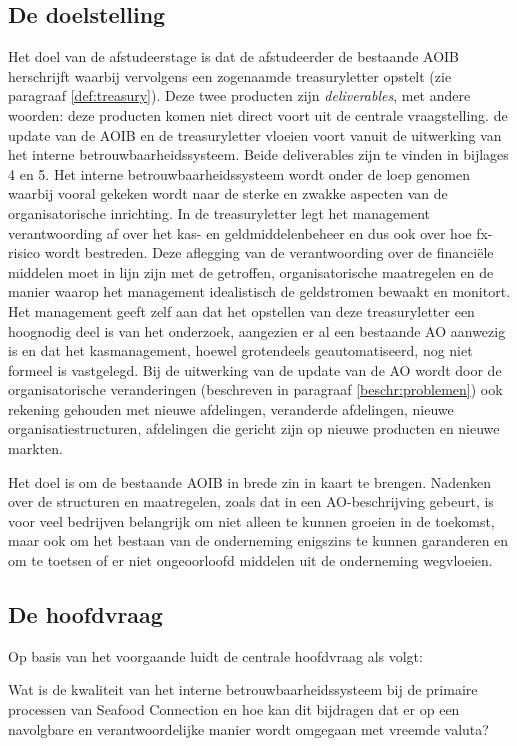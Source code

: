 \subsection{De doelstelling}
Het doel van de afstudeerstage is dat de afstudeerder de bestaande AOIB herschrijft waarbij vervolgens een zogenaamde \gls{treasuryletter} opstelt (zie paragraaf \ref{def:treasury}). Deze twee producten zijn \textit{deliverables}, met andere woorden: deze producten komen niet direct voort uit de centrale vraagstelling. de update van de AOIB en de  \gls{treasuryletter} vloeien voort vanuit de uitwerking van het interne betrouwbaarheidssysteem. Beide deliverables zijn te vinden in bijlages 4 en 5. 
Het interne betrouwbaarheidssysteem wordt onder de loep genomen waarbij vooral gekeken wordt naar de sterke en zwakke aspecten van de organisatorische inrichting. In de \gls{treasuryletter} legt het management verantwoording af over het kas- en geldmiddelenbeheer en dus ook over hoe \gls{fx}-risico wordt bestreden. Deze aflegging van de verantwoording over de financiële middelen moet in lijn zijn met de getroffen, organisatorische maatregelen en de manier waarop het management idealistisch de geldstromen bewaakt en monitort. Het management geeft zelf aan dat het opstellen van deze \gls{treasuryletter} een hoognodig deel is van het onderzoek, aangezien er al een bestaande AO aanwezig is en dat het kasmanagement, hoewel grotendeels geautomatiseerd, nog niet formeel is vastgelegd. Bij de uitwerking van de update van de AO wordt door de organisatorische veranderingen (beschreven in paragraaf \ref{beschr:problemen}) ook rekening gehouden met nieuwe afdelingen, veranderde afdelingen, nieuwe organisatiestructuren, afdelingen die gericht zijn op nieuwe producten en nieuwe markten.

Het doel is om de bestaande AOIB in brede zin in kaart te brengen. Nadenken over de structuren en maatregelen, zoals dat in een AO-beschrijving gebeurt, is voor veel bedrijven belangrijk om niet alleen te kunnen groeien in de toekomst, maar ook om het bestaan van de onderneming enigszins te kunnen garanderen en om te toetsen of er niet ongeoorloofd middelen uit de onderneming wegvloeien.


\subsection{De hoofdvraag}
Op basis van het voorgaande luidt de centrale hoofdvraag als volgt:

\smallskip
\noindent
\begin{center}
{\large{Wat is de kwaliteit van het interne betrouwbaarheidssysteem bij de primaire processen van Seafood Connection en hoe kan dit bijdragen dat er op een navolgbare en verantwoordelijke manier wordt omgegaan met vreemde valuta?}} 
\end{center}

